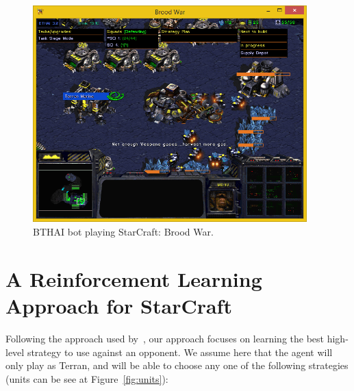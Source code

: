\begin{figure}[ht]
\centering
\includegraphics[width=400px]{images/game-play}
\caption{BTHAI bot playing StarCraft: Brood War.}
\label{fig:game-play}
\end{figure}



\section{A Reinforcement Learning Approach for StarCraft}
\label{sec:rl-sc}

Following the approach used by~\cite{amato2010highlevel}, our approach focuses on learning the best high-level strategy to use against an opponent. 
We assume here that the agent will only play as Terran, and will be able to choose any one of the following strategies (units can be see at Figure~\ref{fig:units}):

